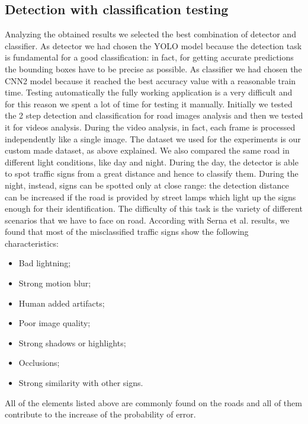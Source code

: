 \subsection{Detection with classification testing}
Analyzing the obtained results we selected the best combination of detector and classifier. As detector we had chosen the YOLO model because the detection task is fundamental for a good classification: in fact, for getting accurate predictions the bounding boxes have to be precise as possible. As classifier we had chosen the CNN2 model because it reached the best accuracy value with a reasonable train time. Testing automatically the fully working application is a very difficult and for this reason we spent a lot of time for testing it manually. Initially we tested the 2 step detection and classification for road images analysis and then we tested it for videos analysis. During the video analysis, in fact, each frame is processed independently like a single image. The dataset we used for the experiments is our custom made dataset, as above explained. We also compared the same road in different light conditions, like day and night. During the day, the detector is able to spot traffic signs from a great distance and hence to classify them. During the night, instead, signs can be spotted only at close range: the detection distance can be increased if the road is provided by street lamps which light up the signs enough for their identification. 
The difficulty of this task is the variety of different scenarios that we have to face on road. According with Serna et al. \cite{gamezPaper} results, we found that most of the misclassified traffic signs show the following characteristics:
\begin{itemize}
	\item Bad lightning;
	\item Strong motion blur;
	\item Human added artifacts;
	\item Poor image quality;
	\item Strong shadows or highlights;
	\item Occlusions;
	\item Strong similarity with other signs.
\end{itemize} 
All of the elements listed above are commonly found on the roads and all of them contribute to the increase of the probability of error.